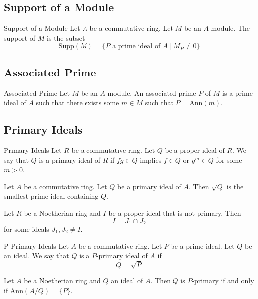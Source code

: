 \documentclass[a4paper]{article}
\begin{document}
\subsection{Support of a Module}
\begin{defn}{Support of a Module}{} Let $A$ be a commutative ring. Let $M$ be an $A$-module. The support of $M$ is the subset $$\text{Supp}(M)=\{P\text{ a prime ideal of }A\;|\;M_P\neq 0\}$$
\end{defn}

\subsection{Associated Prime}
\begin{defn}{Associated Prime}{} Let $M$ be an $A$-module. An associated prime $P$ of $M$ is a prime ideal of $A$ such that there exists some $m\in M$ such that $P=\text{Ann}(m)$. 
\end{defn}

\subsection{Primary Ideals}
\begin{defn}{Primary Ideals}{} Let $R$ be a commutative ring. Let $Q$ be a proper ideal of $R$. We say that $Q$ is a primary ideal of $R$ if $fg\in Q$ implies $f\in Q$ or $g^m\in Q$ for some $m>0$. 
\end{defn}

\begin{lmm}{}{} Let $A$ be a commutative ring. Let $Q$ be a primary ideal of $A$. Then $\sqrt{Q}$ is the smallest prime ideal containing $Q$. 
\end{lmm}

\begin{lmm}{}{} Let $R$ be a Noetherian ring and $I$ be a proper ideal that is not primary. Then $$I=J_1\cap J_2$$ for some ideals $J_1,J_2\neq I$. 
\end{lmm}

\begin{defn}{P-Primary Ideals}{} Let $A$ be a commutative ring. Let $P$ be a prime ideal. Let $Q$ be an ideal. We say that $Q$ is a $P$-primary ideal of $A$ if $$Q=\sqrt{P}$$
\end{defn}

\begin{thm}{}{} Let $A$ be a Noetherian ring and $Q$ an ideal of $A$. Then $Q$ is $P$-primary if and only if $\text{Ann}(A/Q)=\{P\}$. 
\end{thm}
\end{document}
